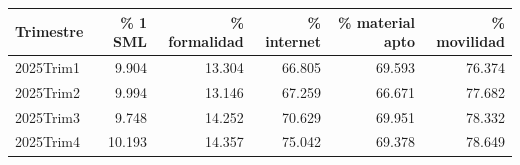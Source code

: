 \begin{tabular}{lrrrrr}
\toprule
Trimestre & \% 1 SML & \% formalidad & \% internet & \% material apto & \% movilidad\\
\midrule
2025Trim1 & 9.904 & 13.304 & 66.805 & 69.593 & 76.374\\
2025Trim2 & 9.994 & 13.146 & 67.259 & 66.671 & 77.682\\
2025Trim3 & 9.748 & 14.252 & 70.629 & 69.951 & 78.332\\
2025Trim4 & 10.193 & 14.357 & 75.042 & 69.378 & 78.649\\
\bottomrule
\end{tabular}
